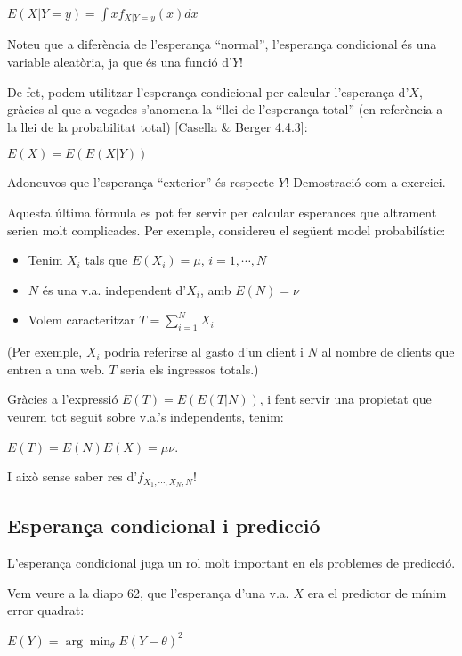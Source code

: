 \documentclass[letterpaper,10pt,english]{sphinxmanual}
\begin{document}
\(E(X|Y=y) = \int x f_{X|Y=y}(x) dx\)

Noteu que a diferència de l’esperança “normal”, l’esperança condicional
és una variable aleatòria, ja que és una funció d’\(Y\)!

De fet, podem utilitzar l’esperança condicional per calcular l’esperança d’\(X\),
gràcies al que a vegades s’anomena la “llei de l’esperança total” (en referència
a la llei de la probabilitat total) {[}Casella \& Berger 4.4.3{]}:

\(E(X) = E(E(X|Y))\)

Adoneu\sphinxhyphen{}vos que l’esperança “exterior” és respecte \(Y\)! Demostració com a exercici.

Aquesta última fórmula es pot fer servir per calcular esperances que altrament
serien molt complicades. Per exemple, considereu el següent model probabilístic:
\begin{itemize}
\item {} 
Tenim \(X_i\) tals que \(E(X_i) = \mu\), \(i=1, \cdots, N\)

\item {} 
\(N\) és una v.a. independent d’\(X_i\), amb \(E(N) = \nu\)

\item {} 
Volem caracteritzar \(T = \sum_{i=1}^N X_i\)

\end{itemize}

(Per exemple, \(X_i\) podria referir\sphinxhyphen{}se al gasto d’un client i \(N\) al
nombre de clients que entren a una web. \(T\) seria els ingressos totals.)

Gràcies a l’expressió \(E(T) = E(E(T|N))\), i fent servir una propietat
que veurem tot seguit sobre v.a.’s independents, tenim:

\(E(T) = E(N)E(X) = \mu \nu\).

I això sense saber res d’\(f_{X_1, \cdots, X_N, N}\)!


\subsection{Esperança condicional i predicció}
\label{\detokenize{0_Intro/0_1_Repas_probabilitat:esperanca-condicional-i-prediccio}}
L’esperança condicional juga un rol molt
important en els problemes de predicció.

Vem veure a la diapo 62, que l’esperança d’una v.a. \(X\) era el predictor de
mínim error quadrat:

\(E(Y) = \arg\min_{\theta} E(Y - \theta)^2\)
\end{document}
